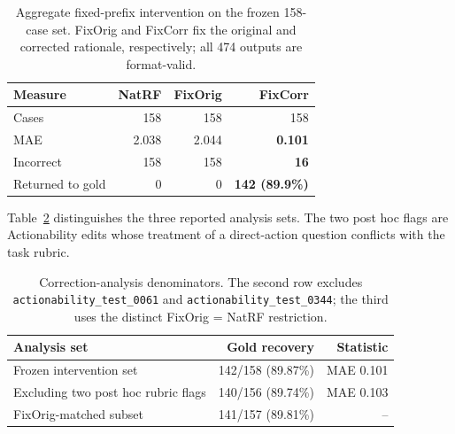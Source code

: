 \begin{table}[!tp]
\centering
\captionsetup{font=normalsize,skip=2pt}
\small
\setlength{\tabcolsep}{8pt}
\renewcommand{\arraystretch}{1.05}

\begin{tabular}{@{}lrrr@{}}
\toprule
Measure & NatRF & FixOrig & FixCorr \\
\midrule
Cases & 158 & 158 & 158 \\
MAE & 2.038 & 2.044 & \textbf{0.101} \\
Incorrect & 158 & 158 & \textbf{16} \\
Returned to gold & 0 & 0 & \textbf{142 (89.9\%)} \\
\bottomrule
\end{tabular}

\caption{Aggregate fixed-prefix intervention on the frozen 158-case
set. FixOrig and FixCorr fix the original and corrected rationale,
respectively; all 474 outputs are format-valid.}
\label{tab:full-correction-aggregate}
\end{table}

Table~\ref{tab:correction-analysis-sets} distinguishes the three reported
analysis sets. The two post hoc flags are Actionability edits whose treatment
of a direct-action question conflicts with the task rubric.

\begin{table}[!tp]
\centering
\captionsetup{font=normalsize,skip=2pt}
\small
\setlength{\tabcolsep}{8pt}
\renewcommand{\arraystretch}{1.05}

\begin{tabular}{@{}lrr@{}}
\toprule
Analysis set & Gold recovery & Statistic \\
\midrule

Frozen intervention set
& 142/158 (89.87\%)
& MAE 0.101 \\

Excluding two post hoc rubric flags
& 140/156 (89.74\%)
& MAE 0.103 \\

FixOrig-matched subset
& 141/157 (89.81\%)
& -- \\

\bottomrule
\end{tabular}

\caption{Correction-analysis denominators. The second row excludes
\texttt{actionability\_test\_0061} and \texttt{actionability\_test\_0344};
the third uses the distinct FixOrig = NatRF restriction.}
\label{tab:correction-analysis-sets}
\end{table}


